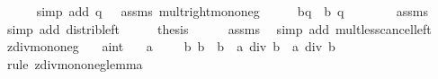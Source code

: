 \begin{isabellebody}
\ \ \ \ \isamarkupfalse%
\ {\isacharparenleft}{\kern0pt}simp\ add{\isacharcolon}{\kern0pt}\ {\isacartoucheopen}q{\isacharprime}{\kern0pt}\ {\isasymle}\ {}{\isacartoucheclose}\ assms{\isacharparenleft}{\kern0pt}{}{\isacharparenright}{\kern0pt}\ mult{\isacharunderscore}{\kern0pt}right{\isacharunderscore}{\kern0pt}mono{\isacharunderscore}{\kern0pt}neg{\isacharparenright}{\kern0pt}\isanewline
\ \ \isamarkupfalse%
\ \isamarkupfalse%
\ {\isachardoublequoteopen}b{\isacharasterisk}{\kern0pt}q{\isacharprime}{\kern0pt}\ {\isacharless}{\kern0pt}\ b{\isacharasterisk}{\kern0pt}\ {\isacharparenleft}{\kern0pt}q\ {\isacharplus}{\kern0pt}\ {}{\isacharparenright}{\kern0pt}{\isachardoublequoteclose}\isanewline
\ \ \ \ \isamarkupfalse%
\ assms\ \isamarkupfalse%
\ {\isacharparenleft}{\kern0pt}simp\ add{\isacharcolon}{\kern0pt}\ distrib{\isacharunderscore}{\kern0pt}left{\isacharparenright}{\kern0pt}\isanewline
\ \ \isamarkupfalse%
\ \isamarkupfalse%
\ {\isacharquery}{\kern0pt}thesis\isanewline
\ \ \ \ \isamarkupfalse%
\ assms\ \isamarkupfalse%
\ {\isacharparenleft}{\kern0pt}simp\ add{\isacharcolon}{\kern0pt}\ mult{\isacharunderscore}{\kern0pt}less{\isacharunderscore}{\kern0pt}cancel{\isacharunderscore}{\kern0pt}left{\isacharparenright}{\kern0pt}\isanewline
{}\isamarkupfalse%
%
\endisatagproof
{\isafoldproof}%
%
\isadelimproof
\isanewline
%
\endisadelimproof
\isanewline
{}\isamarkupfalse%
\ zdiv{\isacharunderscore}{\kern0pt}mono{}{\isacharunderscore}{\kern0pt}neg{\isacharcolon}{\kern0pt}\isanewline
\ \ \ a{\isacharcolon}{\kern0pt}{\isacharcolon}{\kern0pt}int\isanewline
\ \ \ {\isachardoublequoteopen}a\ {\isacharless}{\kern0pt}\ {}{\isachardoublequoteclose}\ {\isachardoublequoteopen}{}\ {\isacharless}{\kern0pt}\ b{\isacharprime}{\kern0pt}{\isachardoublequoteclose}\ {\isachardoublequoteopen}b{\isacharprime}{\kern0pt}\ {\isasymle}\ b{\isachardoublequoteclose}\ \ {\isachardoublequoteopen}a\ div\ b{\isacharprime}{\kern0pt}\ {\isasymle}\ a\ div\ b{\isachardoublequoteclose}\isanewline
%
\isadelimproof
%
\endisadelimproof
%
\isatagproof
{}\isamarkupfalse%
\ {\isacharparenleft}{\kern0pt}rule\ zdiv{\isacharunderscore}{\kern0pt}mono{}{\isacharunderscore}{\kern0pt}neg{\isacharunderscore}{\kern0pt}lemma{\isacharparenright}{\kern0pt}\isanewline
\ \ \isamarkupfalse%

\end{isabellebody}
